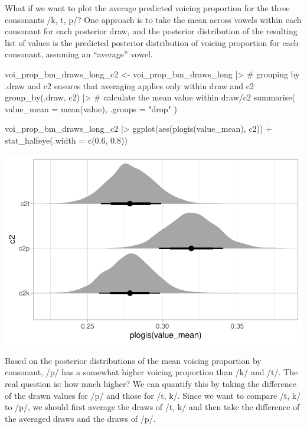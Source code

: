 \documentclass[
  authoryear,
  preprint,
  3p]{elsarticle}
\newenvironment{Shaded}{\begin{snugshade}}{\end{snugshade}}
\newcommand{\AttributeTok}[1]{\textcolor[rgb]{0.40,0.45,0.13}{#1}}
\newcommand{\CommentTok}[1]{\textcolor[rgb]{0.37,0.37,0.37}{#1}}
\newcommand{\FloatTok}[1]{\textcolor[rgb]{0.68,0.00,0.00}{#1}}
\newcommand{\FunctionTok}[1]{\textcolor[rgb]{0.28,0.35,0.67}{#1}}
\newcommand{\NormalTok}[1]{\textcolor[rgb]{0.00,0.23,0.31}{#1}}
\newcommand{\OtherTok}[1]{\textcolor[rgb]{0.00,0.23,0.31}{#1}}
\newcommand{\SpecialCharTok}[1]{\textcolor[rgb]{0.37,0.37,0.37}{#1}}
\newcommand{\StringTok}[1]{\textcolor[rgb]{0.13,0.47,0.30}{#1}}
\begin{document}
What if we want to plot the average predicted voicing proportion for the
three consonants /k, t, p/? One approach is to take the mean across
vowels within each consonant for each posterior draw, and the posterior
distribution of the resulting list of values is the predicted posterior
distribution of voicing proportion for each consonant, assuming an
``average'' vowel.

\begin{Shaded}
\begin{Highlighting}[]
\NormalTok{voi\_prop\_bm\_draws\_long\_c2 }\OtherTok{\textless{}{-}}\NormalTok{ voi\_prop\_bm\_draws\_long }\SpecialCharTok{|\textgreater{}} 
  \CommentTok{\# grouping by .draw and c2 ensures that averaging applies only within draw and c2}
  \FunctionTok{group\_by}\NormalTok{(.draw, c2) }\SpecialCharTok{|\textgreater{}} 
  \CommentTok{\# calculate the mean value within draw/c2}
  \FunctionTok{summarise}\NormalTok{(}
    \AttributeTok{value\_mean =} \FunctionTok{mean}\NormalTok{(value), }\AttributeTok{.groups =} \StringTok{"drop"}
\NormalTok{  )}

\NormalTok{voi\_prop\_bm\_draws\_long\_c2 }\SpecialCharTok{|\textgreater{}} 
  \FunctionTok{ggplot}\NormalTok{(}\FunctionTok{aes}\NormalTok{(}\FunctionTok{plogis}\NormalTok{(value\_mean), c2)) }\SpecialCharTok{+}
  \FunctionTok{stat\_halfeye}\NormalTok{(}\AttributeTok{.width =} \FunctionTok{c}\NormalTok{(}\FloatTok{0.6}\NormalTok{, }\FloatTok{0.8}\NormalTok{))}
\end{Highlighting}
\end{Shaded}

\includegraphics{manuscript_files/figure-pdf/voi-prop-bm-draws-long-c2-1.pdf}

Based on the posterior distributions of the mean voicing proportion by
consonant, /p/ has a somewhat higher voicing proportion than /k/ and
/t/. The real question is: how much higher? We can quantify this by
taking the difference of the drawn values for /p/ and those for /t, k/.
Since we want to compare /t, k/ to /p/, we should first average the
draws of /t, k/ and then take the difference of the averaged draws and
the draws of /p/.
\end{document}
